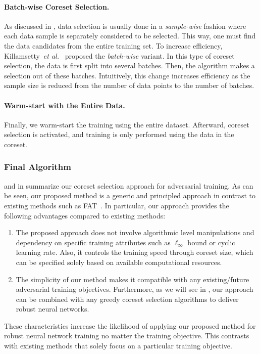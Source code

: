 \documentclass[runningheads]{llncs}
\newcommand{\etal}{\textit{et al.}}
\begin{document}
\paragraph{Batch-wise Coreset Selection.}
	As discussed in , data selection is usually done in a \textit{sample-wise} fashion where each data sample is separately considered to be selected.
	This way, one must find the data candidates from the entire training set.
	To increase efficiency, Killamsetty~\etal~\cite{killamsetty2021gradmatch} proposed the \textit{batch-wise} variant.
	In this type of coreset selection, the data is first split into several batches.
	Then, the algorithm makes a selection out of these batches.
	Intuitively, this change increases efficiency as the sample size is reduced from the number of data points to the number of batches.
\paragraph{Warm-start with the Entire Data.}
	Finally, we warm-start the training using the entire dataset.
	Afterward, coreset selection is activated, and training is only performed using the data in the coreset.

\subsubsection{Final Algorithm}
 and  in  summarize our coreset selection approach for adversarial training.
As can be seen, our proposed method is a generic and principled approach in contrast to existing methods such as FAT~\cite{wong2020fast}.
In particular, our approach provides the following advantages compared to existing methods:
\begin{enumerate}
	\item The proposed approach does not involve algorithmic level manipulations and dependency on specific training attributes such as $\ell_\infty$ bound or cyclic learning rate.
	Also, it controls the training speed through coreset size, which can be specified solely based on available computational resources.
	\item The simplicity of our method makes it compatible with any existing/future adversarial training objectives. Furthermore, as we will see in , our approach can be combined with any greedy coreset selection algorithms to deliver robust neural networks.
\end{enumerate}
These characteristics increase the likelihood of applying our proposed method for robust neural network training no matter the training objective.
This contrasts with existing methods that solely focus on a particular training objective.
\end{document}
